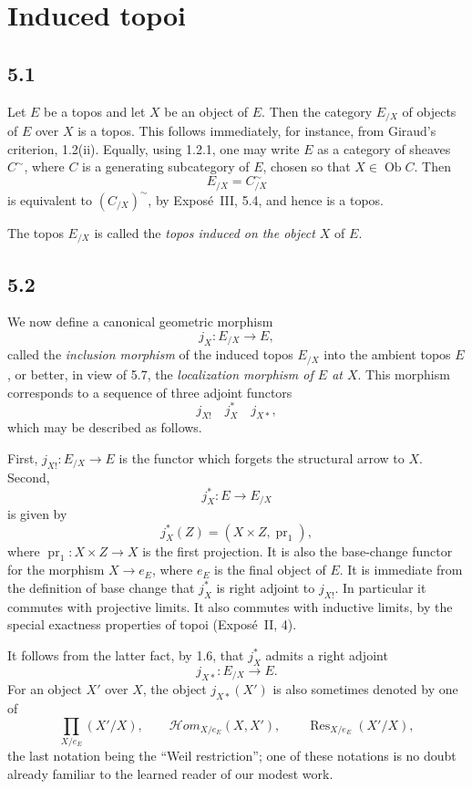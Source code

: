 \documentclass[11pt]{article}
\begin{document}
\section{Induced topoi}

\subsection*{5.1}
Let \(E\) be a topos and let \(X\) be an object of \(E\). Then the category \(E_{/X}\) of objects of \(E\) over \(X\) is a topos. This follows immediately, for instance, from Giraud's criterion, 1.2(ii). Equally, using 1.2.1, one may write \(E\) as a category of sheaves \(C^{\sim}\), where \(C\) is a generating subcategory of \(E\), chosen so that \(X\in\operatorname{Ob}C\). Then
\[
E_{/X}=C^{\sim}_{/X}
\]
is equivalent to \((C_{/X})^{\sim}\), by Expos\'e~III, 5.4, and hence is a topos.

The topos \(E_{/X}\) is called the \emph{topos induced on the object \(X\)} of \(E\).

\subsection*{5.2}
We now define a canonical geometric morphism
\begin{equation*}
j_X:E_{/X}\longrightarrow E,\tag{5.2.1}
\end{equation*}
called the \emph{inclusion morphism} of the induced topos \(E_{/X}\) into the ambient topos \(E\), or better, in view of 5.7, the \emph{localization morphism of \(E\) at \(X\)}. This morphism corresponds to a sequence of three adjoint functors
\begin{equation*}
j_{X!}\quad j_X^*\quad j_{X*},\tag{5.2.2}
\end{equation*}
which may be described as follows.

First, \(j_{X!}:E_{/X}\to E\) is the functor which forgets the structural arrow to \(X\). Second,
\[
j_X^*:E\longrightarrow E_{/X}
\]
is given by
\[
j_X^*(Z)=(X\times Z,\operatorname{pr}_1),
\]
where \(\operatorname{pr}_1:X\times Z\to X\) is the first projection. It is also the base-change functor for the morphism \(X\to e_E\), where \(e_E\) is the final object of \(E\). It is immediate from the definition of base change that \(j_X^*\) is right adjoint to \(j_{X!}\). In particular it commutes with projective limits. It also commutes with inductive limits, by the special exactness properties of topoi (Expos\'e~II, 4).

It follows from the latter fact, by 1.6, that \(j_X^*\) admits a right adjoint
\[
j_{X*}:E_{/X}\longrightarrow E.
\]
For an object \(X'\) over \(X\), the object \(j_{X*}(X')\) is also sometimes denoted by one of
\[
\prod_{X/e_E}(X'/X),\qquad
\mathcal Hom_{X/e_E}(X,X'),\qquad
\operatorname{Res}_{X/e_E}(X'/X),
\]
the last notation being the ``Weil restriction''; one of these notations is no doubt already familiar to the learned reader of our modest work.
\end{document}
